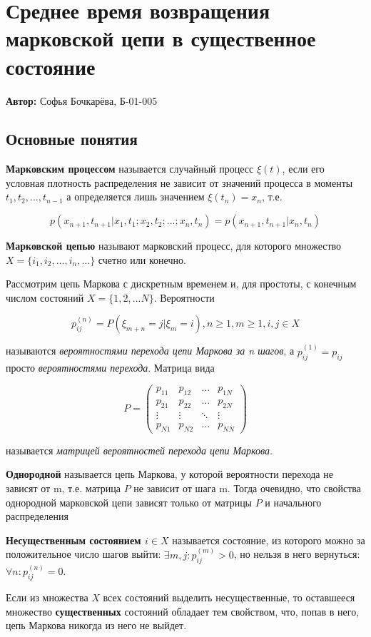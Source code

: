 \section{Среднее время возвращения марковской цепи в существенное состояние}

\textbf{Автор:} Софья Бочкарёва, Б-01-005

\subsection{Основные понятия} 
\textbf{Марковским процессом} называется случайный процесс $\xi (t)$, если его условная плотность распределения не зависит от значений процесса в моменты $t_1, t_2, ..., t_{n-1}$ а определяется лишь значением $\xi(t_n) = x_n$, т.е.

$$p(x_{n + 1}, t_{n + 1} | x_1, t_1; x_2, t_2;...;x_n, t_n) = p(x_{n + 1}, t_{n + 1} | x_n, t_n)$$

\textbf{Марковской цепью} называют марковский процесс, для которого множество $X = \{i_1, i_2, ..., i_n, ...\}$ счетно или конечно. 
\par\medskip
Рассмотрим цепь Маркова с дискретным временем и, для простоты, с конечным числом состояний $X = \{1, 2, ... N\}$. Вероятности

$$p_{ij}^{(n)} = P(\xi_{m+n} = j | \xi_m = i), n \geq 1, m \geq 1, i,j \in X $$

называются \textit{вероятностями перехода цепи Маркова за n шагов}, а $p_{ij}^{(1)} = p_{ij}$ просто \textit{вероятностями перехода}. Матрица вида

\begin{equation*}
	P = \left(
	\begin{array}{cccc}
	p_{11} & p_{12} & \ldots & p_{1N}\\
	p_{21} & p_{22} & \ldots & p_{2N}\\
	\vdots & \vdots & \ddots & \vdots\\
	p_{N1} & p_{N2} & \ldots & p_{NN}
	\end{array}
	\right)
\end{equation*}

называется \textit{матрицей вероятностей перехода цепи Маркова}.
\par\medskip
\textbf{Однородной} называется цепь Маркова, у которой вероятности перехода не зависят от m, т.е. матрица $P$ не зависит от шага m. Тогда очевидно, что свойства однородной марковской цепи зависят только от матрицы $P$ и начального распределения
\par\medskip
\textbf{Несущественным состоянием $i \in X$} называется состояние, из которого можно за положительное число шагов выйти: $\exists m, j : p_{ij}^{(m)} > 0$, но нельзя в него вернуться: \mbox{$\forall n : p_{ij}^{(n)} = 0$.}
\par\medskip
Если из множества $X$ всех состояний выделить несущественные, то оставшееся множество \textbf{существенных} состояний обладает тем свойством, что, попав в него, цепь Маркова никогда из него не выйдет. 

